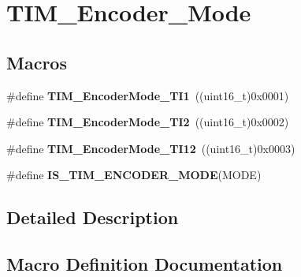 \hypertarget{group___t_i_m___encoder___mode}{}\section{T\+I\+M\+\_\+\+Encoder\+\_\+\+Mode}
\label{group___t_i_m___encoder___mode}
\subsection*{Macros}
\begin{DoxyCompactItemize}
\item 
\#define {\bfseries T\+I\+M\+\_\+\+Encoder\+Mode\+\_\+\+T\+I1}~((uint16\+\_\+t)0x0001)\hypertarget{group___t_i_m___encoder___mode_gabc63e3617a938382f87439ec58768b8e}{}\label{group___t_i_m___encoder___mode_gabc63e3617a938382f87439ec58768b8e}

\item 
\#define {\bfseries T\+I\+M\+\_\+\+Encoder\+Mode\+\_\+\+T\+I2}~((uint16\+\_\+t)0x0002)\hypertarget{group___t_i_m___encoder___mode_ga5627a2d5d47b7301c7dbb29d20ae00e3}{}\label{group___t_i_m___encoder___mode_ga5627a2d5d47b7301c7dbb29d20ae00e3}

\item 
\#define {\bfseries T\+I\+M\+\_\+\+Encoder\+Mode\+\_\+\+T\+I12}~((uint16\+\_\+t)0x0003)\hypertarget{group___t_i_m___encoder___mode_ga12511f903de08f1a634ff7828757f081}{}\label{group___t_i_m___encoder___mode_ga12511f903de08f1a634ff7828757f081}

\item 
\#define {\bfseries I\+S\+\_\+\+T\+I\+M\+\_\+\+E\+N\+C\+O\+D\+E\+R\+\_\+\+M\+O\+DE}(M\+O\+DE)
\end{DoxyCompactItemize}


\subsection{Detailed Description}


\subsection{Macro Definition Documentation}
